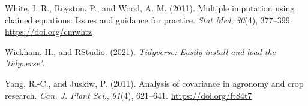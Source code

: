\documentclass[
]{article}
\newlength{\cslhangindent}
\newlength{\cslentryspacingunit} %
\newenvironment{CSLReferences}[2] %
 {%
  \setlength{\parindent}{0pt}
  \ifodd #1
  \let\oldpar\par
  \def\par{\hangindent=\cslhangindent\oldpar}
  \fi
  \setlength{\parskip}{#2\cslentryspacingunit}
 }%
 {}
\begin{document}
\begin{CSLReferences}{1}{0}
\leavevmode{}%
White, I. R., Royston, P., and Wood, A. M. (2011). Multiple imputation using chained equations: {Issues} and guidance for practice. \emph{Stat Med}, \emph{30}(4), 377--399. \url{https://doi.org/cmwhtz}

\leavevmode{}%
Wickham, H., and RStudio. (2021). \emph{Tidyverse: {Easily} install and load the 'tidyverse'}.

\leavevmode{}%
Yang, R.-C., and Juskiw, P. (2011). Analysis of covariance in agronomy and crop research. \emph{Can. J. Plant Sci.}, \emph{91}(4), 621--641. \url{https://doi.org/ft84t7}

\end{CSLReferences}
\end{document}
